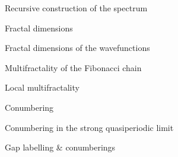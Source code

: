 \documentclass[xcolor=x11names,compress,professionalfonts]{beamer}
\renewcommand{\(}{\begin{columns}}
\renewcommand{\)}{\end{columns}}
\newcommand{\<}[1]{\begin{column}{#1}}
\renewcommand{\>}{\end{column}}
\begin{document}
\begin{frame}{Recursive construction of the spectrum}
\end{frame}

\begin{frame}{Fractal dimensions}
\end{frame}

\begin{frame}{Fractal dimensions of the wavefunctions}
\end{frame}

\begin{frame}{Multifractality of the Fibonacci chain}
\end{frame}

\begin{frame}{Local multifractality}
\end{frame}

\begin{frame}{Conumbering}
\end{frame}

\begin{frame}{Conumbering in the strong quasiperiodic limit}
\end{frame}

\begin{frame}{Gap labelling \& conumberings}
\end{frame}
\end{document}
